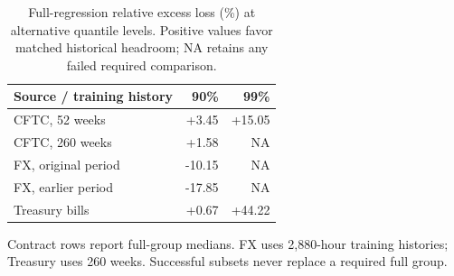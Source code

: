 \begin{table}[htbp]\centering\small
\caption{Full-regression relative excess loss (\%) at alternative quantile levels. Positive values favor matched historical headroom; NA retains any failed required comparison.}\label{tab:v12-tau}
\begin{tabular}{lrr}\toprule
Source / training history & 90\% & 99\% \\\midrule
CFTC, 52 weeks & +3.45 & +15.05 \\
CFTC, 260 weeks & +1.58 & \textsc{NA} \\
FX, original period & -10.15 & \textsc{NA} \\
FX, earlier period & -17.85 & \textsc{NA} \\
Treasury bills & +0.67 & +44.22 \\
\bottomrule\end{tabular}
\par\vspace{2pt}\begin{minipage}{.95\linewidth}\footnotesize
Contract rows report full-group medians. FX uses 2,880-hour training histories; Treasury uses 260 weeks. Successful subsets never replace a required full group.
\end{minipage}\end{table}